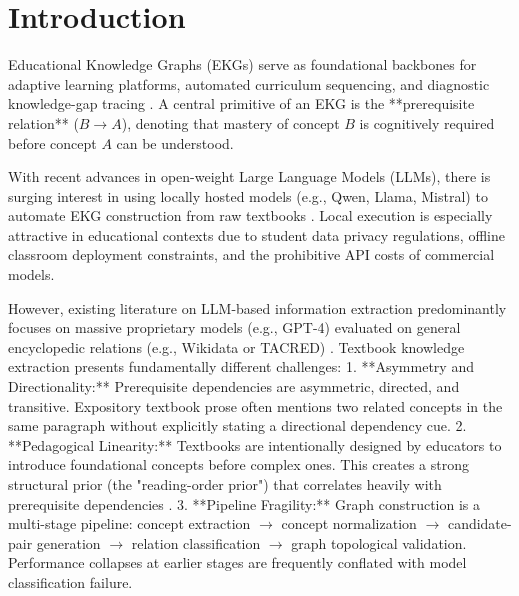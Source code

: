 \documentclass[11pt,a4paper]{article}
\begin{document}
\section{Introduction}

Educational Knowledge Graphs (EKGs) serve as foundational backbones for adaptive learning platforms, automated curriculum sequencing, and diagnostic knowledge-gap tracing \cite{chen2018prereq,alzetta2020prereq}. A central primitive of an EKG is the **prerequisite relation** ($B \to A$), denoting that mastery of concept $B$ is cognitively required before concept $A$ can be understood. 

With recent advances in open-weight Large Language Models (LLMs), there is surging interest in using locally hosted models (e.g., Qwen, Llama, Mistral) to automate EKG construction from raw textbooks \cite{carta2023iterative,trajanoska2023llm}. Local execution is especially attractive in educational contexts due to student data privacy regulations, offline classroom deployment constraints, and the prohibitive API costs of commercial models.

However, existing literature on LLM-based information extraction predominantly focuses on massive proprietary models (e.g., GPT-4) evaluated on general encyclopedic relations (e.g., Wikidata or TACRED) \cite{kommineni2024llm}. Textbook knowledge extraction presents fundamentally different challenges:
1. **Asymmetry and Directionality:** Prerequisite dependencies are asymmetric, directed, and transitive. Expository textbook prose often mentions two related concepts in the same paragraph without explicitly stating a directional dependency cue.
2. **Pedagogical Linearity:** Textbooks are intentionally designed by educators to introduce foundational concepts before complex ones. This creates a strong structural prior (the "reading-order prior") that correlates heavily with prerequisite dependencies \cite{liang2015prereq}.
3. **Pipeline Fragility:** Graph construction is a multi-stage pipeline: concept extraction $\to$ concept normalization $\to$ candidate-pair generation $\to$ relation classification $\to$ graph topological validation. Performance collapses at earlier stages are frequently conflated with model classification failure.
\end{document}
